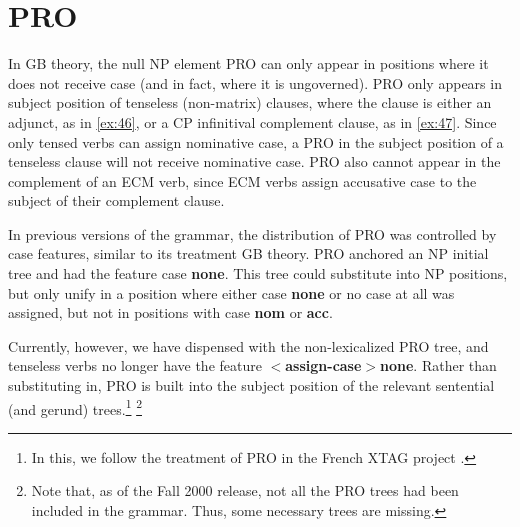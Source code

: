  
 
 
 
\section{PRO} 
 
In GB theory, the null NP element PRO can only appear in positions where it 
does not receive case (and in fact, where it is ungoverned). PRO only appears 
in subject position of tenseless (non-matrix) clauses, where the clause is 
either an adjunct, as in \ref{ex:46}, or a CP infinitival complement clause, as in 
\ref{ex:47}. Since only tensed verbs can assign nominative case, a PRO in the 
subject position of a tenseless clause will not receive nominative case. PRO 
also cannot appear in the complement of an ECM verb, since ECM verbs assign 
accusative case to the subject of their complement clause. 
 
\beginsentences
{}\label{ex:46} 
\label{ex:47} 
\endsentences

 
In previous versions of the grammar, the distribution of PRO was controlled by 
case features, similar to its treatment GB theory. PRO anchored an NP initial 
tree and had the feature case {\bf none}. This tree could substitute into NP 
positions, but only unify in a position where either case {\bf none} or no case 
at all was assigned, but not in positions with case {\bf nom} or {\bf acc}. 
 
Currently, however, we have dispensed with the non-lexicalized PRO tree, and 
tenseless verbs no longer have the 
feature {\bf $<$assign-case$>$none}. Rather than substituting in, PRO 
is built into the subject position of the relevant sentential (and gerund) 
trees.\footnote{In this, we follow the treatment of PRO in the French XTAG project \cite{ACK00}.} \footnote{Note that, as of the Fall 2000 release, not all the PRO trees had been included in the grammar. Thus, some necessary trees are missing.} 
 

